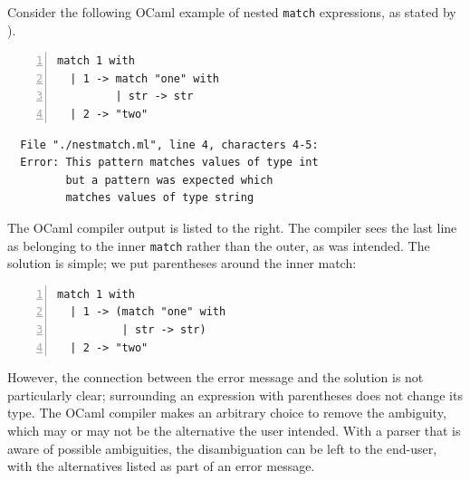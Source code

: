 \documentclass[runningheads]{llncs}
\newcommand{\ocaml}{\lstinline[language={[objective]caml}]}
\begin{document}
Consider the following OCaml example of nested \verb|match| expressions, as stated by \cite{palmkvistCreatingDomainSpecificLanguages2019}).

\begin{minipage}{.35\textwidth}
\begin{lstlisting}[language={[objective]caml},numbers=left]
match 1 with
  | 1 -> match "one" with
         | str -> str
  | 2 -> "two"
\end{lstlisting}
\end{minipage}
\vrule
\begin{minipage}{\textwidth}
\begin{lstlisting}
  File "./nestmatch.ml", line 4, characters 4-5:
  Error: This pattern matches values of type int
         but a pattern was expected which
         matches values of type string
\end{lstlisting}
\end{minipage}


\noindent The OCaml compiler output is listed to the right. The compiler sees the last line as belonging to the inner \ocaml{match} rather than the outer, as was intended. The solution is simple; we put parentheses around the inner match:

\begin{minipage}{\textwidth}
\begin{lstlisting}[language={[objective]caml},numbers=left]
match 1 with
  | 1 -> (match "one" with
          | str -> str)
  | 2 -> "two"
\end{lstlisting}
\end{minipage}

\noindent However, the connection between the error message and the solution is not particularly clear; surrounding an expression with parentheses does not change its type.
%
%
%
%
%
%
The OCaml compiler makes an arbitrary choice to remove the ambiguity, which may or may not be the alternative the user intended. With a parser that is aware of possible ambiguities, the disambiguation can be left to the end-user, with the alternatives listed as part of an error message.
\end{document}
